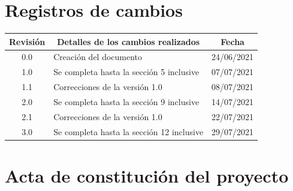\documentclass[
11pt, %
]{charter}
\begin{document}
\maketitle
\thispagestyle{empty}
\pagebreak


\thispagestyle{empty}
{\setlength{\parskip}{0pt}
\tableofcontents{}
}
\pagebreak


\section*{Registros de cambios}
\label{sec:registro}


\begin{table}[ht]
\label{tab:registro}
\centering
\begin{tabularx}{\linewidth}{@{}|c|X|c|@{}}
\hline
\rowcolor[HTML]{C0C0C0} 
Revisión & \multicolumn{1}{c|}{\cellcolor[HTML]{C0C0C0}Detalles de los cambios realizados} & Fecha      \\ \hline
0.0      & Creación del documento                                 			& 24/06/2021 \\ \hline
1.0      & Se completa hasta la sección 5 inclusive               	& 07/07/2021 \\ \hline
1.1      & Correcciones de la versión 1.0                 					& 08/07/2021 \\ \hline
2.0      & Se completa hasta la sección 9 inclusive					& 14/07/2021 \\ \hline
2.1      & Correcciones de la versión 1.0 									& 22/07/2021 \\ \hline
3.0      & Se completa hasta la sección 12 inclusive					& 29/07/2021 \\ \hline
\end{tabularx}
\end{table}

\pagebreak



\section*{Acta de constitución del proyecto}
\label{sec:acta}
\end{document}

